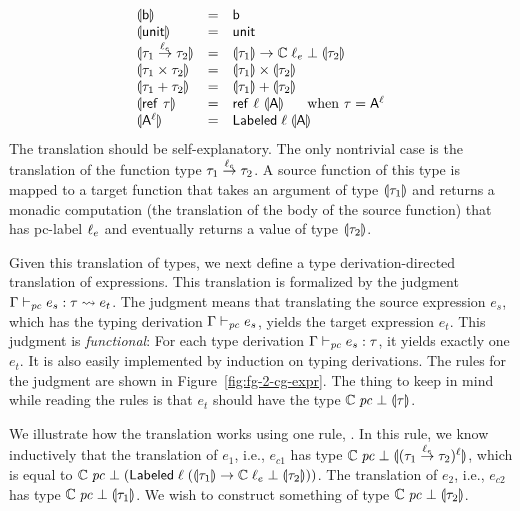 \[
  \begin{array}{lll}
      \llparenthesis \mathsf{b} \rrparenthesis & = & \mathsf{b} \\

      \llparenthesis \mathsf{unit} \rrparenthesis & = & \mathsf{unit}\\

      \llparenthesis \tau_1 \overset{\ell_e}{\to} \tau_2 \rrparenthesis & = &
                                                             \llparenthesis \tau_1 \rrparenthesis \to \mathbb{C}\;\ell_e\;\bot\;\llparenthesis \tau_2 \rrparenthesis \\

      \llparenthesis \tau_1 \times \tau_2 \rrparenthesis & = & \llparenthesis \tau_1 \rrparenthesis \times \llparenthesis \tau_2 \rrparenthesis \\

      \llparenthesis \tau_1 + \tau_2 \rrparenthesis & = & \llparenthesis \tau_1 \rrparenthesis + \llparenthesis \tau_2 \rrparenthesis \\

      \llparenthesis \mathsf{ref} ~\tau \rrparenthesis & = & \mathsf{ref} ~\ell ~\llparenthesis \mathsf{A} \rrparenthesis~~~~\mbox{ when $\tau = \mathsf{A}^{\ell}$}\\

      \llparenthesis \mathsf{A}^{\ell} \rrparenthesis & = & \mathsf{Labeled}\;\ell\;\llparenthesis \mathsf{A} \rrparenthesis
  \end{array}
\]
%
The translation should be self-explanatory. The only nontrivial case
is the translation of the function type $\tau_1
\overset{\ell_e}{\to} \tau_2$. A source function of this type is
mapped to a target function that takes an argument of type
$\llparenthesis \tau_1 \rrparenthesis$ and returns a monadic computation (the translation
of the body of the source function) that has pc-label $\ell_e$ and
eventually returns a value of type $\llparenthesis \tau_2 \rrparenthesis$.

Given this translation of types, we next define a type
derivation-directed translation of expressions. This translation is
formalized by the judgment $\Gamma \vdash_{\mathit{pc}} e_s:\tau \leadsto
e_t$. The judgment means that translating the source expression $e_s$,
which has the typing derivation $\Gamma \vdash_{\mathit{pc}} e_s$, yields the
target expression $e_t$. This judgment is \emph{functional}: For each
type derivation $\Gamma \vdash_{\mathit{pc}} e_s: \tau$, it yields exactly one
$e_t$.  It is also easily implemented by induction on typing
derivations. The rules for the judgment are shown in
Figure~\ref{fig:fg-2-cg-expr}. The thing to keep in mind while reading
the rules is that $e_t$ should have the type
$\mathbb{C}\;\mathit{pc}\;\bot\;\llparenthesis \tau \rrparenthesis$.

We illustrate how the translation works using one rule,
. In this rule, we know inductively that the
translation of $e_1$, i.e., $e_{c1}$ has type
$\mathbb{C}\;\mathit{pc}\;\bot\;\llparenthesis (\tau_1 \overset{\ell_e}{\to}
    \tau_2)^\ell \rrparenthesis$, which is equal to
$\mathbb{C}\;\mathit{pc}\;\bot\;(\mathsf{Labeled}\;\ell\;(\llparenthesis \tau_1 \rrparenthesis \to
    \mathbb{C}\;\ell_e\;\bot\;\llparenthesis \tau_2 \rrparenthesis))$. The translation of
$e_2$, i.e., $e_{c2}$ has type
$\mathbb{C}\;\mathit{pc}\;\bot\;\llparenthesis \tau_1 \rrparenthesis$. We wish to construct something
of type $\mathbb{C}\;\mathit{pc}\;\bot\;\llparenthesis \tau_2 \rrparenthesis$.

